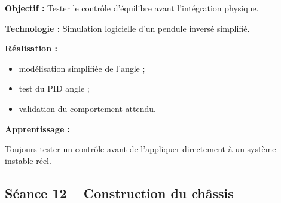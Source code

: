 \documentclass[11pt,a4paper]{article}
\begin{document}
	\begin{sessionbox}
		
		\textbf{Objectif :} Tester le contrôle d'équilibre avant l'intégration physique.
		
		\vspace{0.3cm}
		
		\textbf{Technologie :} Simulation logicielle d'un pendule inversé simplifié.
		
		\vspace{0.3cm}
		
		\textbf{Réalisation :}
		
		\begin{itemize}
			\item modélisation simplifiée de l'angle ;
			\item test du PID angle ;
			\item validation du comportement attendu.
		\end{itemize}
		
		\vspace{0.3cm}
		
		\textbf{Apprentissage :}
		
		Toujours tester un contrôle avant de l'appliquer directement à un système instable réel.
		
	\end{sessionbox}
	
	\subsection*{Séance 12 -- Construction du châssis}
	
\end{document}
